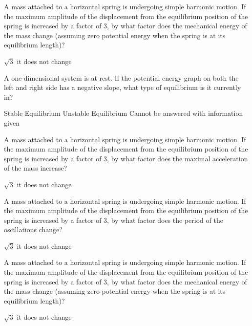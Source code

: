 \question A mass attached to a horizontal spring is undergoing simple harmonic motion. If the maximum amplitude of the displacement from the equilibrium position of the spring is increased by a factor of 3, by what factor does the mechanical energy of the mass change (assuming zero potential energy when the spring is at its equilibrium length)?
\begin{checkboxes}
\choice $\sqrt{3}$
 \correct
\choice it does not change
\end{checkboxes}

\question A one-dimensional system is at rest. If the potential energy graph on both the left and right side has a negative slope, what type of equilibrium is it currently in?
\begin{checkboxes}
\choice Stable Equilibrium
\CorrectChoice Unstable Equilibrium \correct
\choice Cannot be answered with information given
\end{checkboxes}


\question A mass attached to a horizontal spring is undergoing simple harmonic motion. If the maximum amplitude of the displacement from the equilibrium position of the spring is increased by a factor of 3, by what factor does the maximal acceleration of the mass increase?
\begin{checkboxes}
\choice $\sqrt{3}$
 \correct
{}
\choice it does not change
\end{checkboxes}

\question A mass attached to a horizontal spring is undergoing simple harmonic motion. If the maximum amplitude of the displacement from the equilibrium position of the spring is increased by a factor of 3, by what factor does the period of the oscillations change?
\begin{checkboxes}
\choice $\sqrt{3}$
\CorrectChoice it does not change \correct
\end{checkboxes}

\question A mass attached to a horizontal spring is undergoing simple harmonic motion. If the maximum amplitude of the displacement from the equilibrium position of the spring is increased by a factor of 3, by what factor does the mechanical energy of the mass change (assuming zero potential energy when the spring is at its equilibrium length)?
\begin{checkboxes}
\choice $\sqrt{3}$
 \correct
\choice it does not change
\end{checkboxes}


